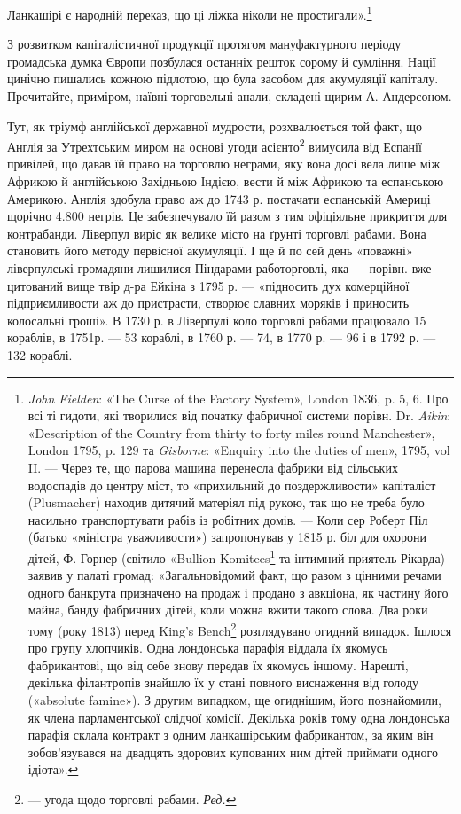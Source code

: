 Ланкашірі є народній переказ, що ці ліжка ніколи не простигали».\footnote{
\emph{John Fielden}: «The Curse of the Factory System», London 1836, p. 5, 6.
Про всі ті гидоти, які творилися від початку фабричної системи порівн.
Dr. \emph{Aikin}: «Description of the Country from thirty to forty miles round
Manchester», London 1795, p. 129 та \emph{Gisborne}: «Enquiry into the duties of
men», 1795, vol II. — Через те, що парова машина перенесла
фабрики від сільських водоспадів до центру міст, то «прихильний до поздержливости»
капіталіст (Plusmacher) находив дитячий матеріял під рукою, так що не треба було
насильно транспортувати рабів із робітних домів. — Коли сер Роберт Піл
(батько «міністра уважливости») запропонував у 1815 р. біл
для охорони дітей, Ф. Горнер (світило «Bullion Komitees\footnote*{
— комітет у справах зливків. \emph{Ред.}
} та інтимний приятель Рікарда) заявив у палаті громад:
«Загальновідомий факт, що разом з цінними речами одного банкрута
призначено на продаж і продано з авкціона, як частину його майна, банду
фабричних дітей, коли можна вжити такого слова. Два роки тому (року
1813) перед King’s Bench\footnote*{
— найвищим судом. \emph{Ред.}
} розглядувано огидний випадок. Ішлося про
групу хлопчиків. Одна лондонська парафія віддала їх якомусь фабрикантові,
що від себе знову передав їх якомусь іншому. Нарешті, декілька філантропів
знайшло їх у стані повного виснаження від голоду («absolute
famine»). З другим випадком, ще огиднішим, його познайомили, як члена
парламентської слідчої комісії. Декілька років тому одна лондонська
парафія склала контракт з одним ланкашірським фабрикантом, за яким
він зобов’язувався на двадцять здорових купованих ним дітей приймати
одного ідіота».
}

З розвитком капіталістичної продукції протягом мануфактурного
періоду громадська думка Європи позбулася останніх решток
сорому й сумління. Нації цинічно пишались кожною підлотою,
що була засобом для акумуляції капіталу. Прочитайте, приміром,
наївні торговельні анали, складені щирим А. Андерсоном.

Тут, як тріумф англійської державної мудрости, розхвалюється
той факт, що Англія за Утрехтським миром на основі
угоди асієнто\footnote*{
— угода щодо торговлі рабами. \emph{Ред.}
} вимусила від Еспанії привілей, що давав їй
право на торговлю неграми, яку вона досі вела лише між Африкою
й англійською Західньою Індією, вести й між Африкою та
еспанською Америкою. Англія здобула право аж до 1743 р. постачати
еспанській Америці щорічно 4.800 негрів. Це забезпечувало
їй разом з тим офіціяльне прикриття для контрабанди.
Ліверпул виріс як велике місто на ґрунті торговлі рабами.
Вона становить його методу первісної акумуляції. І ще й по сей
день «поважні» ліверпулські громадяни лишилися Піндарами
работорговлі, яка — порівн. вже цитований вище твір д-ра Ейкіна
з 1795 р. — «підносить дух комерційної підприємливости аж до
пристрасти, створює славних моряків і приносить колосальні
гроші». В 1730 р. в Ліверпулі коло торговлі рабами працювало
15 кораблів, в 1751р. — 53 кораблі, в 1760 р. — 74, в 1770 р. —
96 і в 1792 р. — 132 кораблі.

